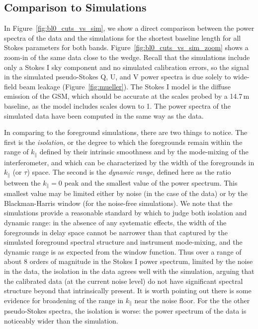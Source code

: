 \documentclass[twocolumn, trackchanges]{aastex61}
\begin{document}
\subsection{Comparison to Simulations}

In Figure~\ref{fig:bl0_cuts_vs_sim}, we show a direct comparison between the
power spectra of the data and the simulations for the shortest baseline length
for all Stokes parameters for both bands. Figure~\ref{fig:bl0_cuts_vs_sim_zoom}
shows a zoom-in of the same data close to the wedge. Recall that the simulations
include only a Stokes I sky component and no simulated calibration errors, so
the signal in the simulated pseudo-Stokes Q, U, and V power spectra is due
solely to wide-field beam leakage (Figure~\ref{fig:mueller}). The Stokes I model
is the diffuse emission of the GSM, which should be accurate at the scales
probed by a 14.7\,m baseline, as the model includes scales down to 1\arcdeg.
The power spectra of the simulated data have been computed in the same way as
the data.

In comparing to the foreground simulations, there are two things to notice.  The
first is the {\it isolation}, or the degree to which the foregrounds remain
within the range of $k_\parallel$ defined by their intrinsic smoothness and by
the mode-mixing of the interferometer, and which can be characterized by the
width of the foregrounds in $k_\parallel$ (or $\tau$) space.  The second is the
{\it dynamic range}, defined here as the ratio between the $k_\parallel=0$ peak
and the smallest value of the power spectrum.  This smallest value may be
limited either by noise (in the case of the data) or by the Blackman-Harris
window (for the noise-free simulations).  We note that the simulations provide a
reasonable standard by which to judge both isolation and dynamic range: in the
absence of any systematic effects, the width of the foregrounds in delay space
cannot be narrower than that captured by the simulated foreground spectral
structure and instrument mode-mixing, and the dynamic range is as expected from
the window function.  Thus over a range of about 8 orders of magnitude in the
Stokes I power spectrum, limited by the noise in the data, the isolation in the
data agrees well with the simulation, arguing that the calibrated data (at the
current noise level) do not have significant spectral structure beyond that
intrinsically present.  It is worth pointing out there is some evidence for
broadening of the range in $k_\parallel$ near the noise floor.  For the the
other pseudo-Stokes spectra, the isolation is worse: the power spectrum of the
data is noticeably wider than the simulation.
\end{document}
